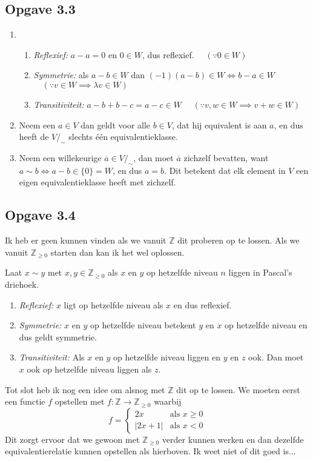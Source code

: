 \documentclass{article}
\newcommand{\Zg}{\mathbb{Z}_{\geq 0}}
\newcommand{\Z}{\mathbb{Z}}
\newcommand{\q}{/_\sim}
\newcommand{\ol}[1]{\overline{#1}}
\newcommand{\tx}[1]{\text{#1}}
\begin{document}
\subsection*{Opgave 3.3}
\begin{enumerate}[label=\alph*)]
	\item
	      \begin{enumerate}[label=\arabic*]
		      \item \emph{Reflexief:} $a-a = 0$ en $0 \in W$,
		            dus reflexief.
		            $\quad (\because 0 \in W)$
		      \item \emph{Symmetrie:} als $a-b \in W$
		            dan $(-1)(a - b) \in W
			            \Longleftrightarrow b - a\in W $
		            $\quad (\because v \in W \implies \lambda v \in W)$
		      \item \emph{Transitiviteit:} $a - b + b - c  =
			            a - c \in W$
		            $\quad (\because v, w \in W \implies v + w \in W)$
	      \end{enumerate}
	\item
	      Neem een $a \in V$ dan geldt voor alle $b \in V$,
	      dat hij equivalent is aan $a$, en dus heeft de
	      $V\q$ slechts één equivalentieklasse.
	\item
	      Neem een willekeurige $\ol{a} \in V\q$,
	      dan moet $\ol{a}$ zichzelf bevatten,
	      want $a \sim b \Leftrightarrow a-b \in \{0\} = W$, en
	      dus $a = b$. Dit betekent dat elk element in $V$
	      een eigen equivalentieklasse heeft met zichzelf.
\end{enumerate}
\subsection*{Opgave 3.4}
Ik heb er geen kunnen vinden als we vanuit $\Z$ dit proberen op te lossen.
Als we vanuit $\Zg$ starten dan kan ik het wel oplossen.

Laat $x \sim y$ met $x, y \in \Zg$ als $x$ en $y$ op hetzelfde niveau $n$ liggen in Pascal's driehoek.
\begin{enumerate}[label=\arabic*]
	\item \emph{Reflexief:} $x$ ligt op hetzelfde niveau als $x$ en dus reflexief.
	\item \emph{Symmetrie:} $x$ en $y$ op hetzelfde niveau betekent $y$ en $x$
	      op hetzelfde niveau en dus geldt symmetrie.
	\item \emph{Transitiviteit:} Als $x$ en $y$ op hetzelfde niveau liggen en $y$ en $z$ ook.
	      Dan moet $x$ ook op hetzelfde niveau liggen als $z$.
\end{enumerate}
Tot slot heb ik nog een idee om alsnog met $\Z$ dit op te lossen.
We moeten eerst een functie $f$ opstellen met $f: \Z \rightarrow \Zg$ waarbij
\[
	f = \begin{cases}
		2x       & \tx{als } x \geq 0 \\
		|2x + 1| & \tx{als } x < 0
	\end{cases}
\]
Dit zorgt ervoor dat we gewoon met $\Zg$ verder kunnen werken en dan
dezelfde equivalentierelatie kunnen opstellen als hierboven.
Ik weet niet of dit goed is...
\end{document}
